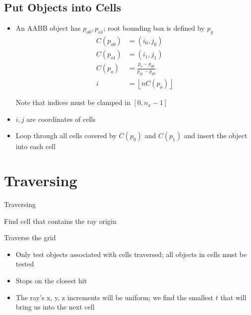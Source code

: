\documentclass[letterpaper, 11pt]{article}
\begin{document}
    \subsection{Put Objects into Cells}

      \begin{itemize}
        \item An AABB object has $ p_{o0}, p_{o1} $; root bounding box is
        defined by $ p_{g} $
        \begin{align}
          C\left( p_{o0} \right) &= \left( i_{0}, j_{0} \right) \\
          C\left( p_{o1} \right) &= \left( i_{1}, j_{1} \right) \\
          C\left( p_{o} \right) &= \frac{p_{o} - p_{g0}}{p_{g1} - p_{g0}} \\
          i &= \left\lfloor n C\left( p_{o} \right) \right\rfloor
        \end{align}

        Note that indices must be clamped in $ \left[ 0, n_{x} - 1 \right] $

        \item $ i, j $ are coordinates of cells
        \item Loop through all cells covered by $ C\left( p_{0} \right) $
        and $ C\left( p_{1} \right) $ and insert the object into each cell
      \end{itemize}

  \section{Traversing}

    \begin{algorithm}
      \caption{Traversing}
       {
        \;
      }
       {
        Find cell that contains the ray origin\;
      }

      Traverse the grid\;
    \end{algorithm}

    \begin{itemize}
      \item Only test objects associated with cells traversed; all objects in
      cells must be tested
      \item Stops on the closest hit
      \item The ray's x, y, z increments will be uniform; we find the smallest
      $ t $ that will bring us into the next cell
    \end{itemize}
\end{document}
